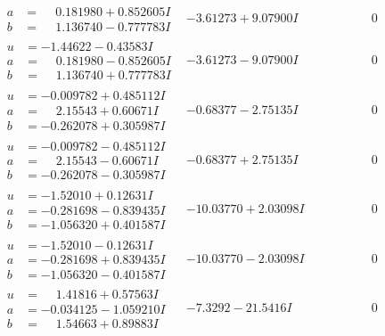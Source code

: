 \documentclass[1p]{elsarticle_modified}
\theoremstyle{definition}
\begin{document}
$$\begin{array}{c|c|c}
\begin{aligned}
a &= \phantom{-}0.181980 + 0.852605 I \\
b &= \phantom{-}1.136740 - 0.777783 I\end{aligned}
 & -3.61273 + 9.07900 I & \phantom{-0.000000 } 0 \\ \hline\begin{aligned}
u &= -1.44622 - 0.43583 I \\
a &= \phantom{-}0.181980 - 0.852605 I \\
b &= \phantom{-}1.136740 + 0.777783 I\end{aligned}
 & -3.61273 - 9.07900 I & \phantom{-0.000000 } 0 \\ \hline\begin{aligned}
u &= -0.009782 + 0.485112 I \\
a &= \phantom{-}2.15543 + 0.60671 I \\
b &= -0.262078 + 0.305987 I\end{aligned}
 & -0.68377 - 2.75135 I & \phantom{-0.000000 } 0 \\ \hline\begin{aligned}
u &= -0.009782 - 0.485112 I \\
a &= \phantom{-}2.15543 - 0.60671 I \\
b &= -0.262078 - 0.305987 I\end{aligned}
 & -0.68377 + 2.75135 I & \phantom{-0.000000 } 0 \\ \hline\begin{aligned}
u &= -1.52010 + 0.12631 I \\
a &= -0.281698 - 0.839435 I \\
b &= -1.056320 + 0.401587 I\end{aligned}
 & -10.03770 + 2.03098 I & \phantom{-0.000000 } 0 \\ \hline\begin{aligned}
u &= -1.52010 - 0.12631 I \\
a &= -0.281698 + 0.839435 I \\
b &= -1.056320 - 0.401587 I\end{aligned}
 & -10.03770 - 2.03098 I & \phantom{-0.000000 } 0 \\ \hline\begin{aligned}
u &= \phantom{-}1.41816 + 0.57563 I \\
a &= -0.034125 - 1.059210 I \\
b &= \phantom{-}1.54663 + 0.89883 I\end{aligned}
 & -7.3292 - 21.5416 I & \phantom{-0.000000 } 0 \\ \hline\begin{aligned}

\end{aligned}
\end{array}$$
\end{document}
